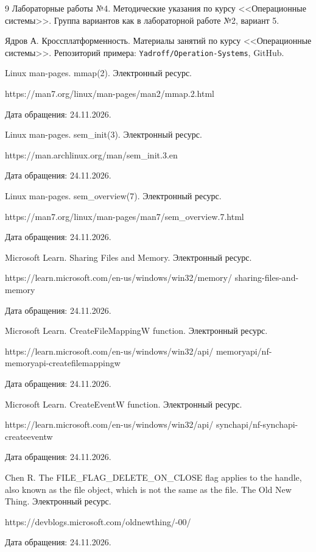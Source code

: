 \begin{thebibliography}{9}
Лабораторные работы №4. Методические указания по курсу <<Операционные системы>>. Группа вариантов как в лабораторной работе №2, вариант 5.

Ядров А. Кроссплатформенность. Материалы занятий по курсу <<Операционные системы>>. Репозиторий примера: \texttt{Yadroff/Operation-Systems}, GitHub.

Linux man-pages. mmap(2). Электронный ресурс.\\
{\small\ttfamily\raggedright
https://man7.org/linux/man-pages/man2/mmap.2.html\par}
Дата обращения: 24.11.2026.

Linux man-pages. sem\_init(3). Электронный ресурс.\\
{\small\ttfamily\raggedright
https://man.archlinux.org/man/sem\_init.3.en\par}
Дата обращения: 24.11.2026.

Linux man-pages. sem\_overview(7). Электронный ресурс.\\
{\small\ttfamily\raggedright
https://man7.org/linux/man-pages/man7/\allowbreak sem\_overview.7.html\par}
Дата обращения: 24.11.2026.

Microsoft Learn. Sharing Files and Memory. Электронный ресурс.\\
{\small\ttfamily\raggedright
https://learn.microsoft.com/en-us/windows/win32/memory/\allowbreak
sharing-files-and-memory\par}
Дата обращения: 24.11.2026.

Microsoft Learn. CreateFileMappingW function. Электронный ресурс.\\
{\small\ttfamily\raggedright
https://learn.microsoft.com/en-us/windows/win32/api/\allowbreak
memoryapi/nf-memoryapi-createfilemappingw\par}
Дата обращения: 24.11.2026.

Microsoft Learn. CreateEventW function. Электронный ресурс.\\
{\small\ttfamily\raggedright
https://learn.microsoft.com/en-us/windows/win32/api/\allowbreak
synchapi/nf-synchapi-createeventw\par}
Дата обращения: 24.11.2026.

Chen R. The FILE\_FLAG\_DELETE\_ON\_CLOSE flag applies to the handle, also known as the file object, which is not the same as the file. The Old New Thing. Электронный ресурс.\\
{\small\ttfamily\raggedright
https://devblogs.microsoft.com/oldnewthing/-00/\par}
Дата обращения: 24.11.2026.
\end{thebibliography}
